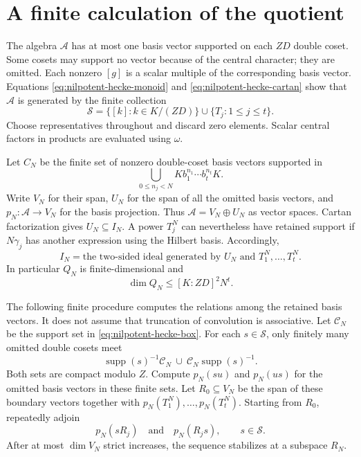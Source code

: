 \documentclass[10pt,letterpaper]{amsart}
\numberwithin{equation}{section}
\theoremstyle{remark}
\begin{document}
\section{A finite calculation of the quotient}
\label{sec:finite-quotient}


The algebra $\mathcal A$ has at most one basis vector supported on each
$ZD$ double coset. Some cosets may support no vector because of the central
character; they are omitted. Each nonzero $[g]$ is a scalar multiple of the
corresponding basis vector. Equations
\eqref{eq:nilpotent-hecke-monoid} and \eqref{eq:nilpotent-hecke-cartan} show
that $\mathcal A$ is generated by the finite collection
\[
 \mathcal S=\{[k]:k\in K/(ZD)\}\cup\{T_j:1\le j\le t\}.
\]
Choose representatives throughout and discard zero elements. Scalar
central factors in products are evaluated using $\omega$.

Let $C_N$ be the finite set of nonzero double-coset basis vectors supported
in
\begin{equation}\label{eq:nilpotent-hecke-box}
 \bigcup_{0\le n_j<N} K b_1^{n_1}\cdots b_t^{n_t}K.
\end{equation}
Write $V_N$ for their span, $U_N$ for the span of all the omitted basis
vectors, and $p_N:\mathcal A\to V_N$ for the basis projection. Thus
$\mathcal A=V_N\oplus U_N$ as vector spaces. Cartan factorization gives
$U_N\subseteq I_N$. A power $T_j^N$ can nevertheless have retained support
if $N\gamma_j$ has another expression using the Hilbert basis. Accordingly,
\begin{equation}\label{eq:nilpotent-hecke-omitted-ideal}
 I_N=\text{the two-sided ideal generated by }U_N
                       \text{ and }T_1^N,\ldots,T_t^N.
\end{equation}
In particular $Q_N$ is finite-dimensional and
\begin{equation}\label{eq:nilpotent-hecke-dimension-bound}
 \dim Q_N\le [K:ZD]^2N^t.
\end{equation}

The following finite procedure computes the relations among the retained
basis vectors. It does not assume that truncation of convolution is
associative. Let $\mathcal C_N$ be the support set in
\eqref{eq:nilpotent-hecke-box}. For each $s\in\mathcal S$, only finitely
many omitted double cosets meet
\[
 \operatorname{supp}(s)^{-1}\mathcal C_N
 \ \cup\ \mathcal C_N\operatorname{supp}(s)^{-1}.
\]
Both sets are compact modulo $Z$. Compute $p_N(su)$ and $p_N(us)$ for
the omitted basis vectors in these finite sets. Let $R_0\subseteq V_N$
be the span of these boundary vectors together with
$p_N(T_1^N),\ldots,p_N(T_t^N)$. Starting from $R_0$, repeatedly adjoin
\[
 p_N(sR_j)\quad\text{and}\quad p_N(R_js),\qquad s\in\mathcal S.
\]
After at most $\dim V_N$ strict increases, the sequence stabilizes at a
subspace $R_N$.
\end{document}
